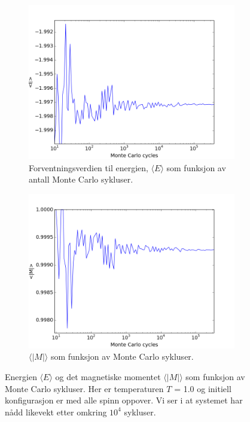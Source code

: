 \documentclass[11pt,a4paper]{article}
\begin{document}
\FloatBarrier
\begin{figure}[!ht]
\centering
\begin{subfigure}{.55\textwidth}
  \centering
  \includegraphics[width=1.1\linewidth]{4cT1upE.png}
  \caption{Forventningsverdien til energien, $\langle E \rangle$ som funksjon av antall Monte Carlo sykluser. }
  \label{e1}
\end{subfigure}%
\begin{subfigure}{.55\textwidth}
  \centering
  \includegraphics[width=1.1\linewidth]{4cT1upM.png}
  \caption{ $\langle |M| \rangle$ som funksjon av Monte Carlo sykluser. }
  \label{m1}
\end{subfigure}
\caption{Energien $\langle E \rangle$ og det magnetiske momentet $\langle |M| \rangle$ som funksjon av Monte Carlo sykluser. Her er temperaturen $T$ = 1.0 og initiell konfigurasjon er med alle spinn oppover. Vi ser i at systemet har nådd likevekt etter omkring $10^4$ sykluser. }
\label{fig:T1up}
\end{figure}
\FloatBarrier
\end{document}
